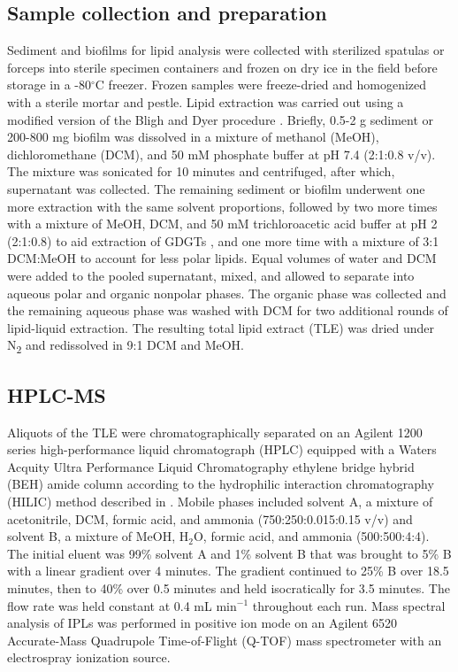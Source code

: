 \subsection{Sample collection and preparation} Sediment and biofilms for lipid analysis were collected with sterilized spatulas or forceps into sterile specimen containers and frozen on dry ice in the field before storage in a -80$^{\circ}$C freezer. Frozen samples were freeze-dried and homogenized with a sterile mortar and pestle. Lipid extraction was carried out using a modified version of the Bligh and Dyer procedure \citep{white1998signature}. Briefly, 0.5-2 g sediment or 200-800 mg biofilm was dissolved in a mixture of methanol (MeOH), dichloromethane (DCM), and 50 mM phosphate buffer at pH 7.4 (2:1:0.8 v/v). The mixture was sonicated for 10 minutes and centrifuged, after which, supernatant was collected. The remaining sediment or biofilm underwent one more extraction with the same solvent proportions, followed by two more times with a mixture of MeOH, DCM, and 50 mM trichloroacetic acid buffer at pH 2 (2:1:0.8) to aid extraction of GDGTs \citep{nishihara1987extraction}, and one more time with a mixture of 3:1 DCM:MeOH to account for less polar lipids. Equal volumes of water and DCM were added to the pooled supernatant, mixed, and allowed to separate into aqueous polar and organic nonpolar phases. The organic phase was collected and the remaining aqueous phase was washed with DCM for two additional rounds of lipid-liquid extraction. The resulting total lipid extract (TLE) was dried under N\textsubscript{2} and redissolved in 9:1 DCM and MeOH.

\subsection{HPLC-MS} Aliquots of the TLE were chromatographically separated on an Agilent 1200 series high-performance liquid chromatograph (HPLC) equipped with a Waters Acquity Ultra Performance Liquid Chromatography ethylene bridge hybrid (BEH) amide column according to the hydrophilic interaction chromatography (HILIC) method described in \cite{wormer2013application}. Mobile phases included solvent A, a mixture of acetonitrile, DCM, formic acid, and ammonia (750:250:0.015:0.15 v/v) and solvent B, a mixture of MeOH, H$_{2}$O, formic acid, and ammonia (500:500:4:4). The initial eluent was 99\% solvent A and 1\% solvent B that was brought to 5\% B with a linear gradient over 4 minutes. The gradient continued to 25\% B over 18.5 minutes, then to 40\% over 0.5 minutes and held isocratically for 3.5 minutes. The flow rate was held constant at 0.4 mL min$^{-1}$ throughout each run. Mass spectral analysis of IPLs was performed in positive ion mode on an Agilent 6520 Accurate-Mass Quadrupole Time-of-Flight (Q-TOF) mass spectrometer with an electrospray ionization source.

